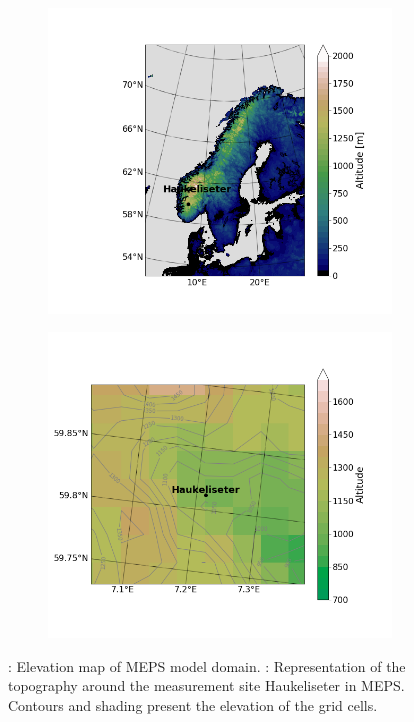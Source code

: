 \begin{figure}[ht!]
	\centering
    \begin{subfigure}[b]{0.53\textwidth}
    	\includegraphics[trim={4.cm 1.8cm 0cm 2.cm},clip,width=1.05\textwidth]{./fig_Norway/Norway_elevation_MEPS}
        \caption{}\label{fig:meps:Norway}
    \end{subfigure}
    \begin{subfigure}[b]{0.46\textwidth}
        \includegraphics[trim={.3cm 2.2cm 1.8cm 2.4cm},clip,width=\textwidth]{./fig_Norway/MEPS_elevation_Haukeli}
        \caption{}\label{fig:meps:site}
      \end{subfigure}
	\caption{\protect{}: Elevation map of MEPS model domain. \protect{}: Representation of the topography around the measurement site Haukeliseter in MEPS. Contours and shading present the elevation of the grid cells.}\label{fig:meps_site}
\end{figure} 